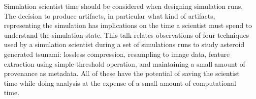 \license


Simulation scientist time should be considered when designing simulation runs. The decision to produce artifacts, in particular what kind of artifacts, representing the simulation has implications on the time a scientist must spend to understand the simulation state. This talk relates observations of four techniques used by a simulation scientist during a set of simulations runs to study asteroid generated tsunami: lossless compression, resampling to image data, feature extraction using simple threshold operation, and maintaining a small amount of provenance as metadata. All of these have the potential of saving the scientist time while doing analysis at the expense of a small amount of computational time.

